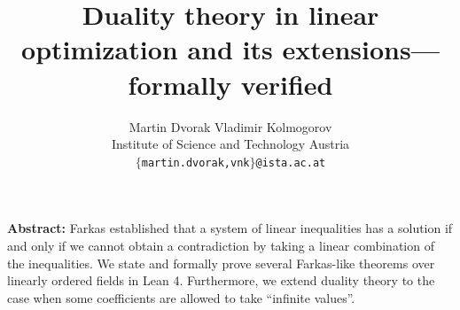 \documentclass[]{article}
\renewcommand{\.}{\hskip .75pt}
\begin{document}


\title{Duality theory in linear optimization and its extensions\:---\:formally verified}

\author{Martin Dvorak \hspace{30pt} Vladimir Kolmogorov \\ \normalsize Institute of Science and Technology Austria \\ {\normalsize\tt $\{$martin.dvorak,vnk$\}$@ista.ac.at}}
\date{}

\maketitle


\noindent \textbf{Abstract:}\;
Farkas established that a system of linear inequalities has a solution if and only if we cannot obtain
a contradiction by taking a linear combination of the inequalities.
We state and formally prove several Farkas-like theorems over linearly ordered fields in Lean 4.
Furthermore, we extend duality theory to the case when some coefficients are allowed to take
``infinite values''.
\medskip
\end{document}
